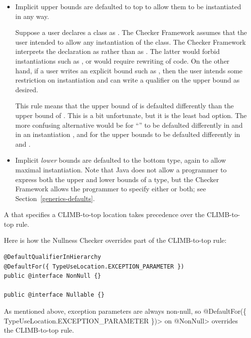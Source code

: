 \begin{itemize}
\item
Implicit upper bounds are defaulted to top to allow them to be instantiated
in any way.

Suppose a user declares a class as .
The Checker Framework assumes that the user intended to allow any
instantiation of the class.  The Checker Framework interprets the
declaration as  rather than as .  The latter would forbid
instantiations such as , or would require
rewriting of code.  On the other hand, if a user writes an explicit bound
such as , then the user
intends some restriction on instantiation and can write a qualifier on the
upper bound as desired.

This rule means that the upper bound of  is defaulted
differently than the upper bound of .
This is a bit unfortunate, but it is the least bad option.  The
more confusing alternative would be for ``'' to be defaulted
differently in  and in an
instantiation , and for the upper bounds to be defaulted
differently in 
and .

\item
Implicit \emph{lower} bounds are defaulted to the bottom type, again to allow
maximal instantiation.  Note that Java does not allow a programmer to
express both the upper and lower bounds of a type, but the Checker
Framework allows the programmer to specify either or both;
see Section~\ref{generics-defaults}.

\end{itemize}

A  that specifies a
CLIMB-to-top location takes precedence over the CLIMB-to-top rule.

Here is how the Nullness Checker overrides part of the CLIMB-to-top rule:

\begin{Verbatim}
@DefaultQualifierInHierarchy
@DefaultFor({ TypeUseLocation.EXCEPTION_PARAMETER })
public @interface NonNull {}

public @interface Nullable {}
\end{Verbatim}

\noindent
As mentioned above, exception parameters are always non-null, so
\<@DefaultFor(\{ TypeUseLocation.EXCEPTION\_PARAMETER \})> on \<@NonNull> overrides
the CLIMB-to-top rule.


